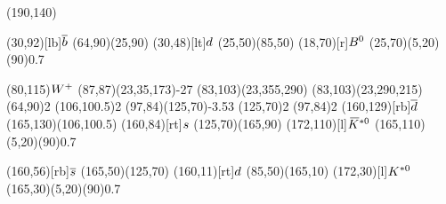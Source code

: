 \documentclass{standalone}
\begin{document}
\begin{axopicture}(190,140)

  \Text(30,92)[lb]{${\overline {{b}}}$}                           %
  \Line[arrow](64,90)(25,90)                               %
  \Text(30,48)[lt]{${d}$}                              %
  \Line[arrow](25,50)(85,50)                               %
  \Text(18,70)[r]{${{B}^0}$}                                   %
  \GOval(25,70)(5,20)(90){0.7}                             %
                                                           
  \Text(80,115){\small{${W^+}$}}                             %
  \PhotonArc(87,87)(23,35,173){-2}{7}                      %
  \Arc[arrow,clockwise,arrowpos=0.4](83,103)(23,355,290)   %
  \Arc[arrow,clockwise,arrowpos=0.4](83,103)(23,290,215)   %
  \Vertex(64,90){2}                                        %
  \Vertex(106,100.5){2}                                    %
  \Gluon(97,84)(125,70){-3.5}{3}                           %
  \Vertex(125,70){2}                                       %
  \Vertex(97,84){2}                                        %
  \Text(160,129)[rb]{${\overline {{d}}}$}                         %
  \Line[arrow](165,130)(106,100.5)                         %
  \Text(160,84)[rt]{${s}$}                             %
  \Line[arrow](125,70)(165,90)                             %
  \Text(172,110)[l]{${{\kern 0.18em\overline{\kern -0.18em K}}{}^{*0}}$}                            %
  \GOval(165,110)(5,20)(90){0.7}                           %
                                                           
  \Text(160,56)[rb]{${\overline {{s}}}$}                          %
  \Line[arrow](165,50)(125,70)                             %
  \Text(160,11)[rt]{${d}$}                             %
  \Line[arrow](85,50)(165,10)                              %
  \Text(172,30)[l]{${{K}^{*0}}$}                              %
  \GOval(165,30)(5,20)(90){0.7}                            %
                                                           
\end{axopicture}
\end{document}
